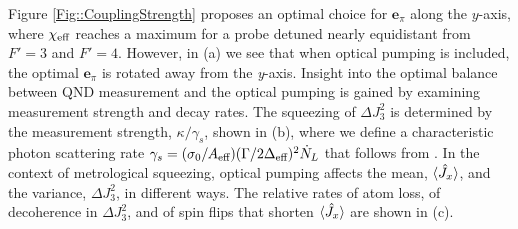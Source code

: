 \documentclass[preprint,aps,pra,onecolumn]{revtex4-1} %
\newcommand{\qaxis}{\mathbf{e}_\pi}
\newcommand{\varz}{\Delta J_3^2}
\begin{document}
Figure \ref{Fig::CouplingStrength} proposes an optimal choice for $\qaxis$ along the $y$-axis, where $\chi_{\text{eff}}$ reaches a maximum for a probe detuned nearly equidistant from $F'=3$ and $F'=4$. However, in (a) we see that when optical pumping is included, the optimal $\qaxis$ is rotated away from the \emph{y}-axis. Insight into the optimal balance between QND measurement and the optical pumping is gained by examining measurement strength and decay rates. The squeezing of $\varz$ is determined by the measurement strength, $\kappa/\gamma_s$, shown in (b), where we define a characteristic photon scattering rate $\gamma_s = (\sigma_0/A_{\text{eff}})(\Gamma/2 \Delta_{\text{eff}})^2 \dot{N}_L$ that follows from . In the context of metrological squeezing, optical pumping affects the mean, $\langle{\hat{J}_x}\rangle$, and the variance, $\varz$, in different ways. The relative rates of atom loss, of decoherence in $\varz$, and of spin flips that shorten $\langle{\hat{J}_x}\rangle$ are shown in (c). 
\end{document}
